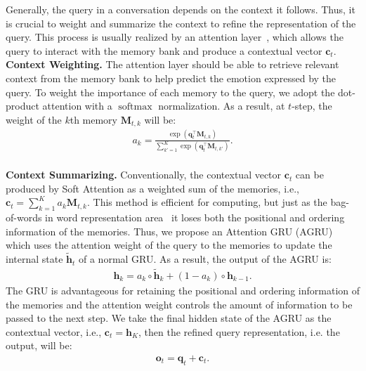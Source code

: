 \documentclass[letterpaper]{article} %
\DeclareMathOperator{\softmax}{softmax}
\begin{document}
Generally, the query in a conversation depends on the context it follows. Thus, it is crucial to weight and summarize the context to refine the representation of the query. This process is usually realized by an attention layer~\cite{DBLP:conf/emnlp/HazarikaPMCZ18,DBLP:conf/naacl/HazarikaPZCMZ18}, which allows the query to interact with the memory bank and produce a contextual vector $\mathbf{c}_t$.
\\[1ex]
\noindent\textbf{Context Weighting.} The attention layer should be able to retrieve relevant context from the memory bank to help predict the emotion expressed by the query. To weight the importance of each memory to the query, we adopt the dot-product attention with a $\softmax$ normalization. As a result, at $t$-step, the weight of the $k$th memory $\mathbf{M}_{t,k}$ will be:
\begin{align}
    a_k = \frac{\exp(\mathbf{q}_t^\top\mathbf{M}_{t,k})}{\sum_{k'=1}^K \exp(\mathbf{q}_t^\top\mathbf{M}_{t,k'})}.
\end{align}
\\[1ex]
\noindent\textbf{Context Summarizing.}
Conventionally, the contextual vector $\mathbf{c}_t$ can be produced by Soft Attention as a weighted sum of the memories, i.e., $\mathbf{c}_t = \sum_{k=1}^{K}a_k\mathbf{M}_{t,k}$. This method is efficient for computing, but just as the bag-of-words in word representation area~\cite{DBLP:conf/nips/MikolovSCCD13,DBLP:conf/emnlp/LingTAFDBTL15} it loses both the positional and ordering information of the memories. Thus, we propose an Attention GRU (AGRU) which uses the attention weight of the query to the memories to update the internal state $\tilde{\mathbf{h}}_t$ of a normal GRU. As a result, the output of the AGRU is:
\begin{align}
    \mathbf{h}_k = a_k\circ\tilde{\mathbf{h}}_k + (1 - a_k)\circ\mathbf{h}_{k-1}.
\end{align}
The GRU is advantageous for retaining the positional and ordering information of the memories and the attention weight controls the amount of information to be passed to the next step. We take the final hidden state of the AGRU as the contextual vector, i.e., $\mathbf{c}_t=\mathbf{h}_K$, then the refined query representation, i.e. the output, will be:
\begin{align}
    \mathbf{o}_t = \mathbf{q}_t + \mathbf{c}_t.
\end{align}
\end{document}
